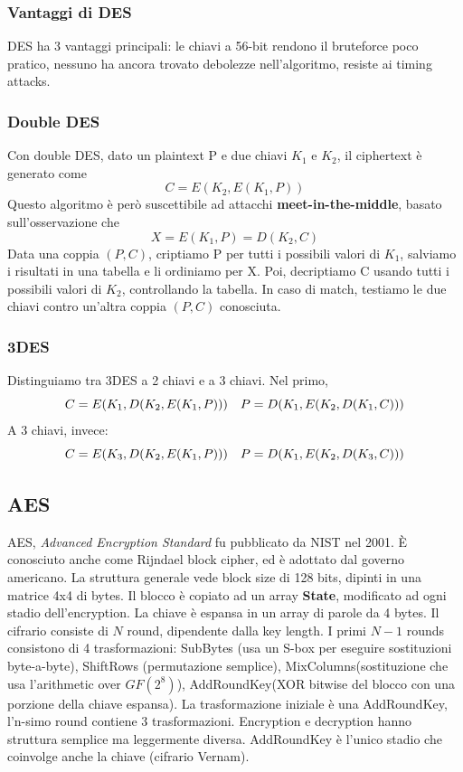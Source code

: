 \documentclass[11pt]{article}
\begin{document}
\subsubsection{Vantaggi di DES}
DES ha 3 vantaggi principali: le chiavi a 56-bit rendono il bruteforce poco pratico, nessuno ha ancora trovato debolezze nell'algoritmo, resiste ai timing attacks. 
\subsubsection{Double DES}
Con double DES, dato un plaintext P e due chiavi $K_1$ e $K_2$, il ciphertext è generato come
\begin{displaymath}
    C=E(K_2, E(K_1,P))
\end{displaymath}
Questo algoritmo è però suscettibile ad attacchi \textbf{meet-in-the-middle}, basato sull'osservazione che
\begin{displaymath}
    X=E(K_1, P) = D(K_2, C)
\end{displaymath}
Data una coppia $(P,C)$, criptiamo P per tutti i possibili valori di $K_1$, salviamo i risultati in una tabella e li ordiniamo per X. Poi, decriptiamo C usando tutti i possibili valori di $K_2$, controllando la tabella. In caso di match, testiamo le due chiavi contro un'altra coppia $(P,C)$ conosciuta. 
\subsubsection{3DES}
Distinguiamo tra 3DES a 2 chiavi e a 3 chiavi. Nel primo,
\begin{displaymath}
    C=E(K_1,D(K_2, E(K_1,P)))\hspace{10px}P=D(K_1, E(K_2, D(K_1,C)))
\end{displaymath}
A 3 chiavi, invece:
\begin{displaymath}
    C=E(K_3,D(K_2, E(K_1,P)))\hspace{10px}P=D(K_1, E(K_2, D(K_3,C)))
\end{displaymath}
\subsection{AES}
AES, \textit{Advanced Encryption Standard} fu pubblicato da NIST nel 2001. È conosciuto anche come Rijndael block cipher, ed è adottato dal governo americano.
La struttura generale vede block size di 128 bits, dipinti in una matrice 4x4 di bytes. Il blocco è copiato ad un array \textbf{State}, modificato ad ogni stadio dell'encryption. La chiave è espansa in un array di parole da 4 bytes. Il cifrario consiste di $N$ round, dipendente dalla key length. I primi $N-1$ rounds consistono di 4 trasformazioni: SubBytes (usa un S-box per eseguire sostituzioni byte-a-byte), ShiftRows (permutazione semplice), MixColumns(sostituzione che usa l'arithmetic over $GF(2^8)$), AddRoundKey(XOR bitwise del blocco con una porzione della chiave espansa). La trasformazione iniziale è una AddRoundKey, l'n-simo round contiene 3 trasformazioni. Encryption e decryption hanno struttura semplice ma leggermente diversa. AddRoundKey è l'unico stadio che coinvolge anche la chiave (cifrario Vernam). 
\end{document}
